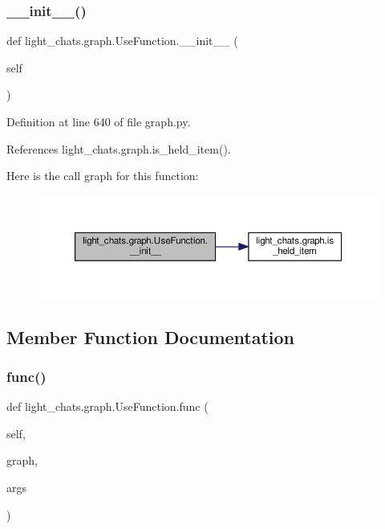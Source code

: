 \subsubsection{\texorpdfstring{\+\_\+\+\_\+init\+\_\+\+\_\+()}{\_\_init\_\_()}}
{\footnotesize\ttfamily def light\+\_\+chats.\+graph.\+Use\+Function.\+\_\+\+\_\+init\+\_\+\+\_\+ (\begin{DoxyParamCaption}\item[{}]{self }\end{DoxyParamCaption})}



Definition at line 640 of file graph.\+py.



References light\+\_\+chats.\+graph.\+is\+\_\+held\+\_\+item().

Here is the call graph for this function\+:
\nopagebreak
\begin{figure}[H]
\begin{center}
\leavevmode
\includegraphics[width=350pt]{classlight__chats_1_1graph_1_1UseFunction_a4a49f4428084f1be52388a47f31bdd19_cgraph}
\end{center}
\end{figure}


\subsection{Member Function Documentation}
\mbox{\label{classlight__chats_1_1graph_1_1UseFunction_a75a1cb4d8d51f0336a3d5cd9f005e266}} 
\subsubsection{\texorpdfstring{func()}{func()}}
{\footnotesize\ttfamily def light\+\_\+chats.\+graph.\+Use\+Function.\+func (\begin{DoxyParamCaption}\item[{}]{self,  }\item[{}]{graph,  }\item[{}]{args }\end{DoxyParamCaption})}

